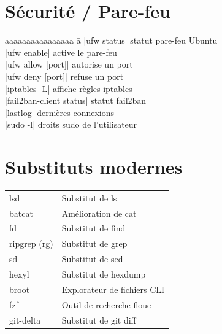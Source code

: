 \documentclass{article}
\begin{document}
\begin{multicols}{4}
    \section*{Sécurité / Pare-feu}
    \begin{tabbing}
        aaaaaaaaaaaaaaaa \= a \kill
        \code|ufw status| \> statut pare-feu Ubuntu \\
        \code|ufw enable| \> active le pare-feu \\
        \code|ufw allow [port]| \> autorise un port \\
        \code|ufw deny [port]| \> refuse un port \\
        \code|iptables -L| \> affiche règles iptables \\
        \code|fail2ban-client status| \> statut fail2ban \\
        \code|lastlog| \> dernières connexions \\
        \code|sudo -l| \> droits sudo de l'utilisateur
    \end{tabbing}

    \section*{Substituts modernes}

    \begin{tabularx}{\columnwidth}{lX}
        lsd          & Substitut de ls             \\
        batcat       & Amélioration de cat         \\
        fd           & Substitut de find           \\
        ripgrep (rg) & Substitut de grep           \\
        sd           & Substitut de sed            \\
        hexyl        & Substitut de hexdump        \\
        broot        & Explorateur de fichiers CLI \\
        fzf          & Outil de recherche floue    \\
        git-delta    & Substitut de git diff       \\
    \end{tabularx}

\end{multicols}
\end{document}
